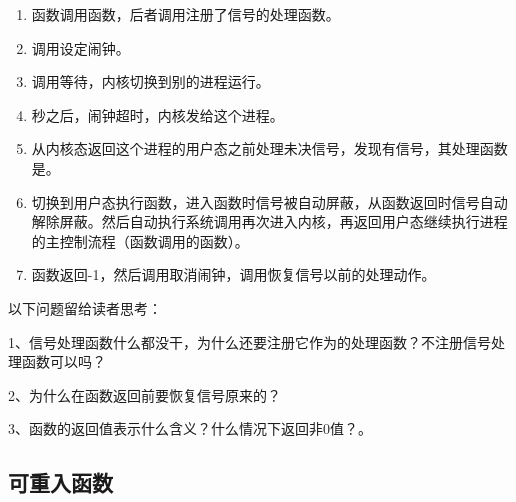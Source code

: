 \begin{enumerate}

\item {}函数调用函数，后者调用注册了信号的处理函数。

\item 调用设定闹钟。

\item 调用等待，内核切换到别的进程运行。

\item {}秒之后，闹钟超时，内核发给这个进程。

\item 从内核态返回这个进程的用户态之前处理未决信号，发现有信号，其处理函数是。

\item 切换到用户态执行函数，进入函数时信号被自动屏蔽，从函数返回时信号自动解除屏蔽。然后自动执行系统调用再次进入内核，再返回用户态继续执行进程的主控制流程（函数调用的函数）。

\item {}函数返回-1，然后调用取消闹钟，调用恢复信号以前的处理动作。
\end{enumerate}


以下问题留给读者思考：



1、信号处理函数什么都没干，为什么还要注册它作为的处理函数？不注册信号处理函数可以吗？



2、为什么在函数返回前要恢复信号原来的？



3、函数的返回值表示什么含义？什么情况下返回非0值？。


\subsection{可重入函数}
%


